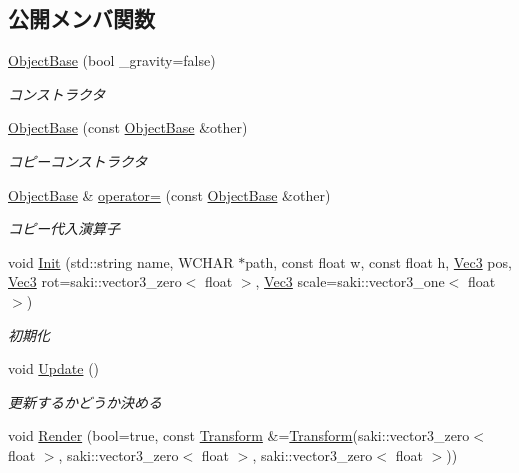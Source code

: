 \subsection*{公開メンバ関数}
\begin{DoxyCompactItemize}
\item 
\mbox{\hyperlink{class_object_base_a8567572c8f524465f9c70cabdb603637}{Object\+Base}} (bool \+\_\+gravity=false)
\begin{DoxyCompactList}\small\item\em コンストラクタ \end{DoxyCompactList}\item 
\mbox{\hyperlink{class_object_base_ace25225cee2f693b3b507a0ef6c19938}{Object\+Base}} (const \mbox{\hyperlink{class_object_base}{Object\+Base}} \&other)
\begin{DoxyCompactList}\small\item\em コピーコンストラクタ \end{DoxyCompactList}\item 
\mbox{\hyperlink{class_object_base}{Object\+Base}} \& \mbox{\hyperlink{class_object_base_aa475bbf5768adfb410951251f0070d19}{operator=}} (const \mbox{\hyperlink{class_object_base}{Object\+Base}} \&other)
\begin{DoxyCompactList}\small\item\em コピー代入演算子 \end{DoxyCompactList}\item 
void \mbox{\hyperlink{class_object_base_a72ec7737feab27edbf576ac1c796c5fe}{Init}} (std\+::string name, W\+C\+H\+AR $\ast$path, const float w, const float h, \mbox{\hyperlink{common_8h_ab1cb35b3a17c398d8ef71d5f779808bf}{Vec3}} pos, \mbox{\hyperlink{common_8h_ab1cb35b3a17c398d8ef71d5f779808bf}{Vec3}} rot=saki\+::vector3\+\_\+zero$<$ float $>$, \mbox{\hyperlink{common_8h_ab1cb35b3a17c398d8ef71d5f779808bf}{Vec3}} scale=saki\+::vector3\+\_\+one$<$ float $>$)
\begin{DoxyCompactList}\small\item\em 初期化 \end{DoxyCompactList}\item 
void \mbox{\hyperlink{class_object_base_a5b5672034139b22235ada326eb16dd3e}{Update}} ()
\begin{DoxyCompactList}\small\item\em 更新するかどうか決める \end{DoxyCompactList}\item 
void \mbox{\hyperlink{class_object_base_a0f39c1b6f0f829ed271bd0fca9fe4756}{Render}} (bool=true, const \mbox{\hyperlink{common_8h_a1c43cb8f0d8a41901f3ce4c67dbbce20}{Transform}} \&=\mbox{\hyperlink{common_8h_a1c43cb8f0d8a41901f3ce4c67dbbce20}{Transform}}(saki\+::vector3\+\_\+zero$<$ float $>$, saki\+::vector3\+\_\+zero$<$ float $>$, saki\+::vector3\+\_\+zero$<$ float $>$))

\end{DoxyCompactItemize}

